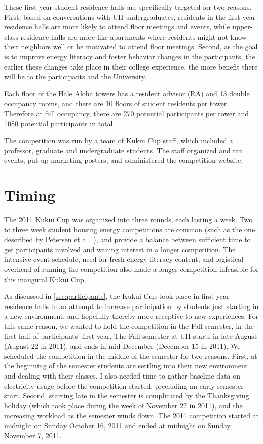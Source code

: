 These first-year student residence halls are specifically targeted for two reasons. First, based on conversations with UH \Manoa undergraduates, residents in the first-year residence halls are more likely to attend floor meetings and events, while upper-class residence halls are more like apartments where residents might not know their neighbors well or be motivated to attend floor meetings. Second, as the goal is to improve energy literacy and foster behavior changes in the participants, the earlier these changes take place in their college experience, the more benefit there will be to the participants and the University.

Each floor of the Hale Aloha towers has a resident advisor (RA) and 13 double occupancy rooms, and there are 10 floors of student residents per tower. Therefore at full occupancy, there are 270 potential participants per tower and 1080 potential participants in total.

The competition was run by a team of Kukui Cup staff, which included a professor, graduate and undergraduate students. The staff organized and ran events, put up marketing posters, and administered the competition website.


\section{Timing}

The 2011 Kukui Cup was organized into three rounds, each lasting a week. Two to three week student housing energy competitions are common (such as the one described by Petersen et al.~\cite{petersen-dorm-energy-reduction}), and provide a balance between sufficient time to get participants involved and waning interest in a longer competition. The intensive event schedule, need for fresh energy literacy content, and logistical overhead of running the competition also made a longer competition infeasible for this inaugural Kukui Cup.

As discussed in \autoref{sec:participants}, the Kukui Cup took place in first-year residence halls in an attempt to increase participation by students just starting in a new environment, and hopefully thereby more receptive to new experiences. For this same reason, we wanted to hold the competition in the Fall semester, in the first half of participants' first year. The Fall semester at UH \Manoa starts in late August (August 22 in 2011), and ends in mid-December (December 15 in 2011). We scheduled the competition in the middle of the semester for two reasons. First, at the beginning of the semester students are settling into their new environment and dealing with their classes. I also needed time to gather baseline data on electricity usage before the competition started, precluding an early semester start. Second, starting late in the semester is complicated by the Thanksgiving holiday (which took place during the week of November 22 in 2011), and the increasing workload as the semester winds down. The 2011 competition started at midnight on Sunday October 16, 2011 and ended at midnight on Sunday November 7, 2011.


